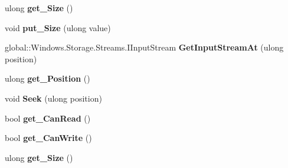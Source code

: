 \begin{DoxyCompactItemize}
\mbox{\label{interface_windows_1_1_storage_1_1_streams_1_1_i_random_access_stream_a6a413a2448bfb33490c1228972b1ac8c}} 
ulong {\bfseries get\+\_\+\+Size} ()
\item 
\mbox{\label{interface_windows_1_1_storage_1_1_streams_1_1_i_random_access_stream_af1e96ffb576c8a390fa379fcb6923c44}} 
void {\bfseries put\+\_\+\+Size} (ulong value)
\item 
\mbox{\label{interface_windows_1_1_storage_1_1_streams_1_1_i_random_access_stream_a937b4579f3c69b8f3e102e47786cd661}} 
global\+::\+Windows.\+Storage.\+Streams.\+I\+Input\+Stream {\bfseries Get\+Input\+Stream\+At} (ulong position)
\item 
\mbox{\label{interface_windows_1_1_storage_1_1_streams_1_1_i_random_access_stream_aac0ed113bee77668c3882dd6d533c50e}} 
ulong {\bfseries get\+\_\+\+Position} ()
\item 
\mbox{\label{interface_windows_1_1_storage_1_1_streams_1_1_i_random_access_stream_a85c3af465abf7d76b4e63d17a6822fb0}} 
void {\bfseries Seek} (ulong position)
\item 
\mbox{\label{interface_windows_1_1_storage_1_1_streams_1_1_i_random_access_stream_ae4d5064fd211749208909f7f6fe63102}} 
bool {\bfseries get\+\_\+\+Can\+Read} ()
\item 
\mbox{\label{interface_windows_1_1_storage_1_1_streams_1_1_i_random_access_stream_a4794da7c24985d3c5fd5660548461faf}} 
bool {\bfseries get\+\_\+\+Can\+Write} ()
\item 
\mbox{\label{interface_windows_1_1_storage_1_1_streams_1_1_i_random_access_stream_a6a413a2448bfb33490c1228972b1ac8c}} 
ulong {\bfseries get\+\_\+\+Size} ()

\end{DoxyCompactItemize}
